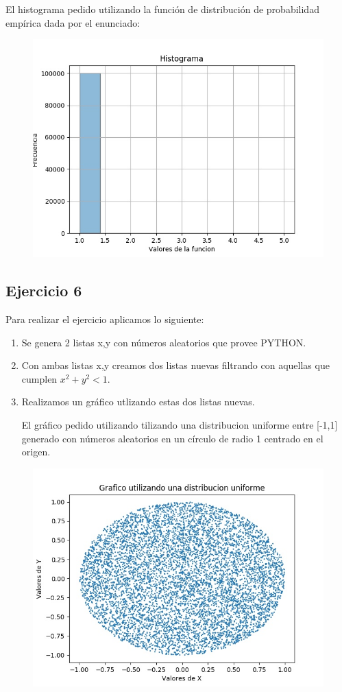 \documentclass[11pt,a4paper]{article}
\begin{document}
		El histograma pedido utilizando la función de distribución de probabilidad empírica dada por el enunciado:
		\begin{figure}[H]
  			\centering
    			\includegraphics[width=14cm]{imagenes/histogramaEjer5}
		\end{figure}

	\subsection{Ejercicio 6}
	    Para realizar el ejercicio aplicamos lo siguiente:
	    \begin{enumerate}
	        \item Se genera 2 listas x,y con números aleatorios que provee PYTHON.
	        \item Con ambas listas x,y creamos dos listas nuevas filtrando con aquellas que cumplen $x^2+y^2<1$.
	        \item Realizamos un gráfico utlizando estas dos listas nuevas.
	        
		El gráfico pedido utilizando tilizando una distribucion uniforme entre [-1,1] generado con números aleatorios en un círculo de radio 1 centrado en el origen.
		\end{enumerate}
		\begin{figure}[H]
  			\centering
    			\includegraphics[width=14cm]{imagenes/histogramaEjer6}
		\end{figure}
\end{document}

